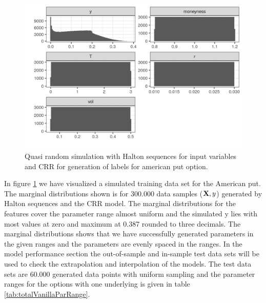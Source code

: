 \begin{figure}[th]
\centering
\includegraphics{Figures/marginalAmerPut.png}
\decoRule
\caption[Marginal Distributions For American Put]{Quasi random simulation with Halton sequences for input variables and CRR for generation of labels for american put option.}
\label{fig:marginalAmerPut}
\end{figure}

In figure \ref{fig:marginalAmerPut} we have visualized a simulated training data set for the American put. The marginal distributions shown is for $300.000$ data samples ($\mathbf{X},y$) generated by Halton sequences and the CRR model. The marginal distributions for the features cover the parameter range almost uniform and the simulated y lies with most values at zero and maximum at 0.387 rounded to three decimals. The marginal distributions shows that we have successfully generated parameters in the given ranges and the parameters are evenly spaced in the ranges. In the model performance section the out-of-sample and in-sample test data sets will be used to check the extrapolation and interpolation of the models. The test data sets are 60.000 generated data points with uniform sampling and the parameter ranges for the options with one underlying is given in table \ref{tab:totalVanillaParRange}.


